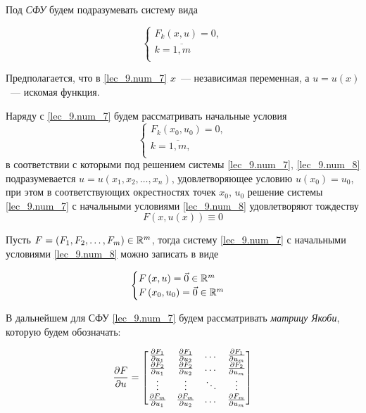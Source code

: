 \documentclass[../../main.tex]{subfiles}
\begin{document}
Под \emph{СФУ} будем подразумевать систему вида

\begin{equation}
    \label{lec_9.num_7}
    \begin{cases} 
        F_k\left(x, u\right) = 0, \\ 
        k = \overline{1, m} \\
    \end{cases}    
\end{equation}

Предполагается, что в \eqref{lec_9.num_7} $x$~--- независимая
переменная, а $u = u\left(x\right)$~--- искомая функция.

Наряду с \eqref{lec_9.num_7} будем рассматривать начальные условия
\begin{equation}
    \label{lec_9.num_8}
    \begin{cases}
        F_k\left(x_0, u_0\right) = 0, \\
        k = \overline{1, m}, \\
    \end{cases}
\end{equation}
в соответствии с которыми под решением системы
\eqref{lec_9.num_7}, \eqref{lec_9.num_8}
подразумевается $u = u(x_1, x_2, \dots, x_n)$,
удовлетворяющее условию
$u\left(x_0\right) = u_0$,
при этом в соответствующих окрестностях точек $x_0$, $u_0$
решение системы \eqref{lec_9.num_7}
с начальными условиями 
\eqref{lec_9.num_8} удовлетворяют тождеству
\[F(x, u(x)) \equiv 0\]

Пусть $F = \left(F_1, F_2, \dots,F_m\right) \in \mathbb{R}^m$,
тогда систему \eqref{lec_9.num_7}
с начальными условиями 
\eqref{lec_9.num_8} можно записать в виде

\begin{equation}
    \label{lec_9.num_9}
    \begin{cases}
     F\left(x, u\right) = \vec{0} \in \mathbb{R}^m\\
     F\left(x_0, u_0\right) = \vec{0} \in \mathbb{R}^m\\
    \end{cases}
\end{equation}


В дальнейшем для СФУ \eqref{lec_9.num_7} 
будем рассматривать \emph{матрицу Якоби}, которую будем обозначать:

\begin{equation}
    \label{lec_9.num_10}
    \frac{\partial F}{\partial u} =
    \begin{bmatrix}
        \frac{\partial F_1}{\partial u_1} & \frac{\partial F_1}{\partial u_2} & \dots & 
        \frac{\partial F_1}{\partial u_m} \\
        \frac{\partial F_2}{\partial u_1} & \frac{\partial F_2}{\partial u_2} &\dots & 
        \frac{\partial F_2}{\partial u_m} \\
        \vdots & \vdots & \ddots & \vdots \\
        \frac{\partial F_m}{\partial u_1} & \frac{\partial F_m}{\partial u_2} & \dots & 
        \frac{\partial F_m}{\partial u_m}
    \end{bmatrix}
\end{equation}
\end{document}
